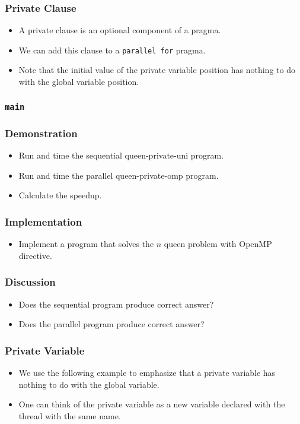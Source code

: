 \documentclass{beamer}
\begin{document}
\begin{frame}
\frametitle{Private Clause}
\begin{itemize}
\item A private clause is an optional component of a pragma.
\item We can add this clause to a {\tt parallel for} pragma.
\item Note that the initial value of the private variable position
 has nothing to do with the global variable position.
\end{itemize}
\end{frame}


\begin{frame}
\frametitle{\tt main} 
\end{frame}

\begin{frame}
\frametitle{Demonstration}
\begin{itemize}
\item Run and time the sequential queen-private-uni program.
\item Run and time the parallel queen-private-omp program.
\item Calculate the speedup.
\end{itemize}
\end{frame}

\begin{frame}
\frametitle{Implementation}
\begin{itemize}
\item Implement a program that solves the $n$ queen problem with
  OpenMP directive.
\end{itemize}
\end{frame}

\begin{frame}
\frametitle{Discussion}
\begin{itemize}
\item Does the sequential program produce correct answer?
\item Does the parallel program produce correct answer?
\end{itemize}
\end{frame}


\begin{frame}
\frametitle{Private Variable}
\begin{itemize}
\item We use the following example to emphasize that a private
  variable has nothing to do with the global variable.
\item One can think of the private variable as a new variable declared
  with the thread with the same name.
\end{itemize}
\end{frame}
\end{document}
